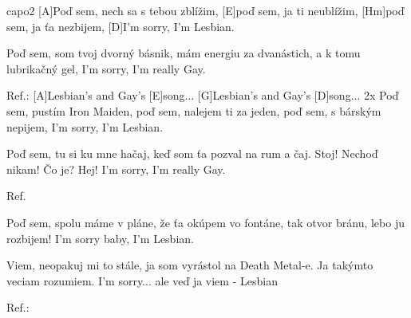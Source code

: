 
capo2
[A]Poď sem, nech sa s tebou zblížim,
[E]poď sem, ja ti neublížim,
[Hm]poď sem, ja ťa nezbijem,
[D]I'm sorry, I'm Lesbian.

Poď sem, som tvoj dvorný básnik,
mám energiu za dvanástich,
a k tomu lubrikačný gel,
I'm sorry, I'm really Gay.

Ref.:
[A]Lesbian's and Gay's [E]song... 
[G]Lesbian's and Gay's [D]song... 2x
\slpc
Poď sem, pustím Iron Maiden,
poď sem, nalejem ti za jeden,
poď sem, s bárským nepijem,
I'm sorry, I'm Lesbian.

Poď sem, tu si ku mne hačaj,
keď som ťa pozval na rum a čaj.
Stoj! Nechoď nikam! Čo je? Hej!
I'm sorry, I'm really Gay.

Ref.

Poď sem, spolu máme v pláne,
že ťa okúpem vo fontáne,
tak otvor bránu, lebo ju rozbijem!
I'm sorry baby, I'm Lesbian.

Viem, neopakuj mi to stále,
ja som vyrástol na Death Metal-e.
Ja takýmto veciam rozumiem.
I'm sorry... ale veď ja viem - Lesbian

Ref.:
